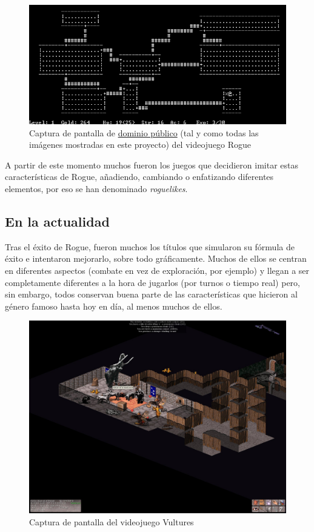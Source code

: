 \begin{figure}[h!]
		\includegraphics[width=\textwidth,height=\textheight,keepaspectratio]{./img/roguegame.PNG}
	\caption{Captura de pantalla de \href{https://en.wikipedia.org/wiki/File:Rogue_Unix_Screenshot_CAR.PNG}{dominio público} (tal y como todas las imágenes mostradas en este proyecto) del videojuego Rogue}
	\label{fig:roguegame}
\end{figure}

A partir de este momento muchos fueron los juegos que decidieron imitar estas características de Rogue, añadiendo, cambiando o enfatizando diferentes elementos, por eso se han denominado \textit{roguelikes}.

\subsection{En la actualidad}

Tras el éxito de Rogue, fueron muchos los títulos que simularon su fórmula de éxito e intentaron mejorarlo, sobre todo gráficamente. Muchos de ellos se centran en diferentes aspectos (combate en vez de exploración, por ejemplo) y llegan a ser completamente diferentes a la hora de jugarlos (por turnos o tiempo real) pero, sin embargo, todos conservan buena parte de las características que hicieron al género famoso hasta hoy en día, al menos muchos de ellos.

\begin{figure}[h!]
		\includegraphics[width=\textwidth,height=\textheight,keepaspectratio]{./img/Vultures.jpg}
	\caption{Captura de pantalla del videojuego Vultures}
	\label{fig:vulturesgame}
\end{figure}

